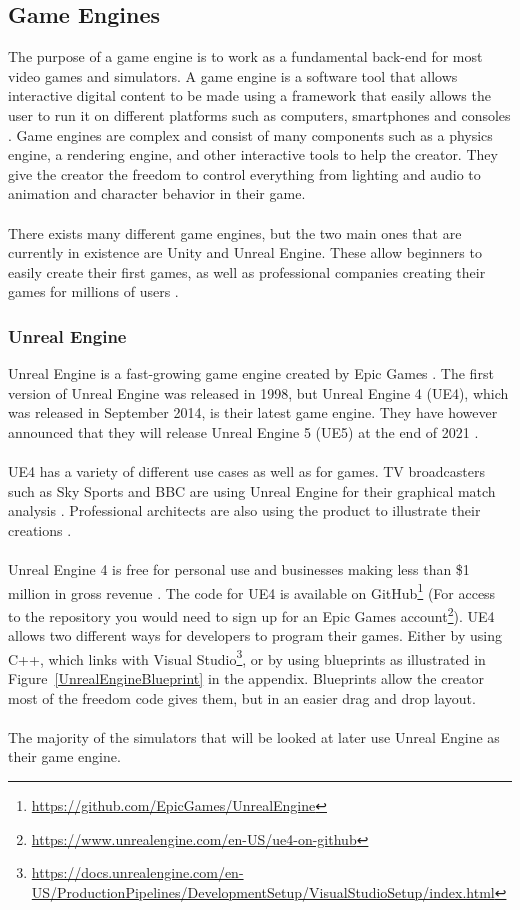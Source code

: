 \subsection{Game Engines} \label{GameEngines}
The purpose of a game engine is to work as a fundamental back-end for most video games and simulators. A game engine is a software tool that allows interactive digital content to be made using a framework that easily allows the user to run it on different platforms such as computers, smartphones and consoles \cite{GameEngine_UnityGame_book}. Game engines are complex and consist of many components such as a physics engine, a rendering engine, and other interactive tools to help the creator. They give the creator the freedom to control everything from lighting and audio to animation and character behavior in their game.
\\~\\
There exists many different game engines, but the two main ones that are currently in existence are Unity and Unreal Engine. These allow beginners to easily create their first games, as well as professional companies creating their games for millions of users \cite{GamesMadeInUnity, GamesMadeInUnrealEngine}.

\subsubsection{Unreal Engine}
Unreal Engine is a fast-growing game engine created by Epic Games \cite{UnrealEngine_Book}. The first version of Unreal Engine was released in 1998, but Unreal Engine 4 (UE4), which was released in September 2014, is their latest game engine. They have however announced that they will release Unreal Engine 5 (UE5) at the end of 2021 \cite{UE5}. 
\\~\\
UE4 has a variety of different use cases as well as for games. TV broadcasters such as Sky Sports and BBC are using Unreal Engine for their graphical match analysis \cite{UnrealEngine_LiveBroadcast}. Professional architects are also using the product to illustrate their creations \cite{UnrealEngine_Automative}.   
\\~\\
Unreal Engine 4 is free for personal use and businesses making less than \$1 million in gross revenue \cite{UE5}. The code for UE4 is available on GitHub\footnote{\url{https://github.com/EpicGames/UnrealEngine}} (For access to the repository you would need to sign up for an Epic Games account\footnote{\url{https://www.unrealengine.com/en-US/ue4-on-github}}). UE4 allows two different ways for developers to program their games. Either by using C++, which links with Visual Studio\footnote{\url{https://docs.unrealengine.com/en-US/ProductionPipelines/DevelopmentSetup/VisualStudioSetup/index.html}}, or by using blueprints as illustrated in Figure~\ref{UnrealEngineBlueprint} in the appendix. Blueprints allow the creator most of the freedom code gives them, but in an easier drag and drop layout.
\\~\\
The majority of the simulators that will be looked at later use Unreal Engine as their game engine. 


